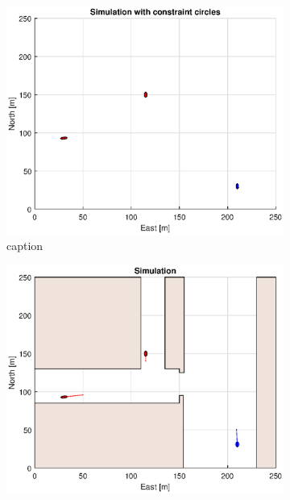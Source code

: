 \clearpage
\begin{figure}[!b] %
    \begin{subfigure}[b]{0.49\textwidth}
        \centering
        \includegraphics[width=\textwidth]{Images/Figures/Havn1/Simple1_f1_Frame1}
        \caption{caption}
    \end{subfigure}
    \hfill
    \begin{subfigure}[b]{0.499\textwidth}
        \centering
        \includegraphics[width=\textwidth]{Images/Figures/Havn1/Simple1_f600_Frame1}

\end{subfigure}
\end{figure}
